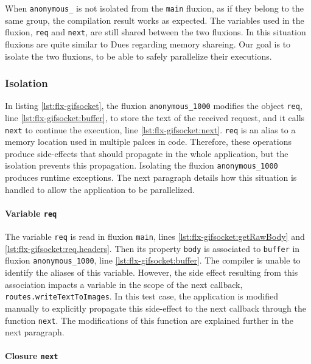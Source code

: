 When \texttt{anonymous\_} is not isolated from the \texttt{main} fluxion, as if they belong to the same group, the compilation result works as expected.
The variables used in the fluxion, \texttt{req} and \texttt{next}, are still shared between the two fluxions.
In this situation fluxions are quite similar to Dues regarding memory shareing.
Our goal is to isolate the two fluxions, to be able to safely parallelize their executions.

\subsubsection{Isolation} \label{chapter5:flx:evaluation:isolation}

In listing \ref{lst:flx-gifsocket}, the fluxion \texttt{anonymous\_1000} modifies the object \texttt{req}, line \ref{lst:flx-gifsocket:buffer}, to store the text of the received request, and it calls \texttt{next} to continue the execution, line \ref{lst:flx-gifsocket:next}.
\texttt{req} is an alias to a memory location used in multiple palces in code.
Therefore, these operations produce side-effects that should propagate in the whole application, but the isolation prevents this propagation.
Isolating the fluxion \texttt{anonymous\_1000} produces runtime exceptions.
The next paragraph details how this situation is handled to allow the application to be parallelized.

\paragraph{Variable \texttt{req}}

The variable \texttt{req} is read in fluxion \texttt{main}, lines \ref{lst:flx-gifsocket:getRawBody} and \ref{lst:flx-gifsocket:req.headers}.
Then its property \texttt{body} is associated to \texttt{buffer} in fluxion \texttt{anonymous\_1000}, line \ref{lst:flx-gifsocket:buffer}.
The compiler is unable to identify the aliases of this variable. %
However, the side effect resulting from this association impacts a variable in the scope of the next callback, \texttt{routes.write\-Text\-To\-Images}.
In this test case, the application is modified manually to explicitly propagate this side-effect to the next callback through the function \texttt{next}.
The modifications of this function are explained further in the next paragraph.

\paragraph{Closure \texttt{next}}

